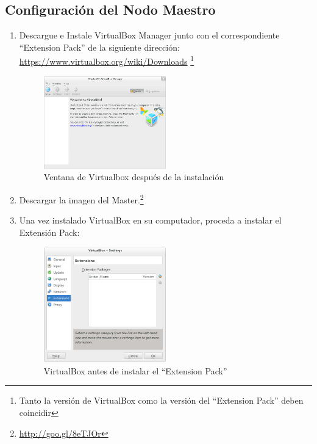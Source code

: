 \subsection{Configuración del Nodo Maestro}
\begin{enumerate}

\item Descargue e Instale VirtualBox Manager junto con el correspondiente ``Extension Pack'' de la siguiente dirección: \url{https://www.virtualbox.org/wiki/Downloads} \footnote{Tanto la versión de VirtualBox como la versión del ``Extension Pack'' deben coincidir}

	\begin{figure}[H]
		\centering
		\includegraphics[width=0.5\textwidth]{aux/vb_instalado}
		\caption{Ventana de Virtualbox después de la instalación}
		\label{vb_instalado}
	\end{figure}


\item Descargar la imagen del Master.\footnote{\url{http://goo.gl/8eTJOr}}



\item Una vez instalado VirtualBox en su computador, proceda a instalar el Extensión Pack: 

	
	\begin{figure}[H]
		\centering
		\includegraphics[width=0.5\textwidth]{aux/sinextensionpack}
		\caption{VirtualBox antes de instalar el ``Extension Pack''}
	\end{figure}
	

\end{enumerate}
